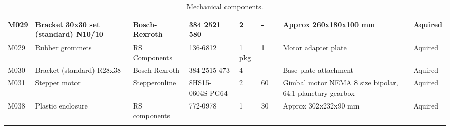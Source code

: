 \begin{longtable}{|m{}|m{}|m{}|m{}|m{}|m{}|m{}|m{}|m{}|}
M029        & Bracket 30x30 set (standard) N10/10 & Bosch-Rexroth     & 384 2521 580              & 2            & -                            &                            & Approx 260x180x100 mm                                    & Aquired         \\ \hline
M029        & Rubber grommets                     & RS Components     & 136-6812                & 1 pkg        & 1                            &                            & Motor adapter plate                                      & Aquired         \\ \hline
M030        & Bracket (standard) R28x38           & Bosch-Rexroth     & 384 2515 473              & 4            & -                            &                            & Base plate attachment                                    & Aquired         \\ \hline
M031        & Stepper motor                       & Stepperonline     & 8HS15-0604S-PG64        & 2            & 60                           &                            & Gimbal motor NEMA 8 size bipolar, 64:1 planetary gearbox & Aquired         \\ \hline
M038        & Plastic enclosure                   & RS components     & 772-0978                & 1            & 30                           &                            & Approx 302x232x90 mm                                     & Aquired         \\ \hline

\caption{Mechanical components.}
\label{tab:component-mech}
\end{longtable}
\raggedbottom